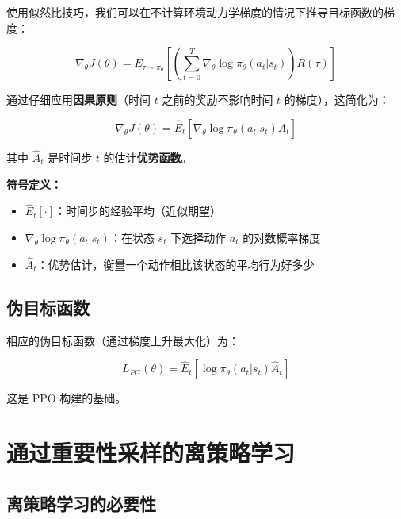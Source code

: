 \documentclass[12pt,a4paper]{article}
\theoremstyle{noteplain}
\theoremstyle{noteexercise}
\begin{document}
使用似然比技巧，我们可以在不计算环境动力学梯度的情况下推导目标函数的梯度：

\begin{equation}\label{eq:pg-theorem}
  \nabla_\theta J(\theta) = E_{\tau \sim \pi_\theta}\left[\left(\sum_{t=0}^{T} \nabla_\theta \log \pi_\theta(a_t|s_t)\right) R(\tau)\right]
\end{equation}

通过仔细应用\textbf{因果原则}（时间 $t$ 之前的奖励不影响时间 $t$ 的梯度），这简化为：

\begin{equation}\label{eq:pg-simplified}
  \nabla_\theta J(\theta) = \hat{E}_t\left[\nabla_\theta \log \pi_\theta(a_t|s_t) \hat{A}_t\right]
\end{equation}

其中 $\hat{A}_t$ 是时间步 $t$ 的估计\textbf{优势函数}。

\textbf{符号定义：}
\begin{itemize}
  \setlength{\itemsep}{0.2em}
  \item $\hat{E}_t[\cdot]$：时间步的经验平均（近似期望）
  \item $\nabla_\theta \log \pi_\theta(a_t|s_t)$：在状态 $s_t$ 下选择动作 $a_t$ 的对数概率梯度
  \item $\hat{A}_t$：优势估计，衡量一个动作相比该状态的平均行为好多少
\end{itemize}

\subsection{伪目标函数}

相应的伪目标函数（通过梯度上升最大化）为：

\begin{equation}\label{eq:l-pg}
  L_{PG}(\theta) = \hat{E}_t\left[\log \pi_\theta(a_t|s_t) \hat{A}_t\right]
\end{equation}

这是 PPO 构建的基础。

\section{通过重要性采样的离策略学习}\label{sec:is}

\subsection{离策略学习的必要性}
\end{document}
